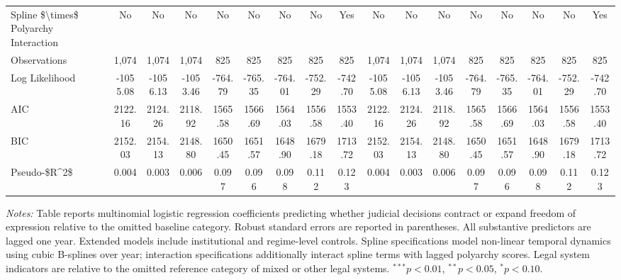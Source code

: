 \begin{table}[htbp]
\begin{tabular}{lcccccccccccccccc}
Spline \$\textbackslash{}times\$ Polyarchy Interaction & No & No & No & No & No & No & No & Yes & No & No & No & No & No & No & No & Yes \\
\addlinespace
\midrule
Observations & 1,074 & 1,074 & 1,074 & 825 & 825 & 825 & 825 & 825 & 1,074 & 1,074 & 1,074 & 825 & 825 & 825 & 825 & 825 \\
Log Likelihood & -1055.08 & -1056.13 & -1053.46 & -764.79 & -765.35 & -764.01 & -752.29 & -742.70 & -1055.08 & -1056.13 & -1053.46 & -764.79 & -765.35 & -764.01 & -752.29 & -742.70 \\
AIC & 2122.16 & 2124.26 & 2118.92 & 1565.58 & 1566.69 & 1564.03 & 1556.58 & 1553.40 & 2122.16 & 2124.26 & 2118.92 & 1565.58 & 1566.69 & 1564.03 & 1556.58 & 1553.40 \\
BIC & 2152.03 & 2154.13 & 2148.80 & 1650.45 & 1651.57 & 1648.90 & 1679.18 & 1713.72 & 2152.03 & 2154.13 & 2148.80 & 1650.45 & 1651.57 & 1648.90 & 1679.18 & 1713.72 \\
Pseudo-\$R\textasciicircum{}2\$ & 0.004 & 0.003 & 0.006 & 0.097 & 0.096 & 0.098 & 0.112 & 0.123 & 0.004 & 0.003 & 0.006 & 0.097 & 0.096 & 0.098 & 0.112 & 0.123 \\

\bottomrule

\end{tabular}

\vspace{0.4em}

\begin{minipage}{0.97\linewidth}
\footnotesize
\textit{Notes:} Table reports multinomial logistic regression coefficients predicting whether judicial decisions contract or expand freedom of expression relative to the omitted baseline category. Robust standard errors are reported in parentheses. All substantive predictors are lagged one year. Extended models include institutional and regime-level controls. Spline specifications model non-linear temporal dynamics using cubic B-splines over year; interaction specifications additionally interact spline terms with lagged polyarchy scores. Legal system indicators are relative to the omitted reference category of mixed or other legal systems. $^{***}p<0.01$, $^{**}p<0.05$, $^{*}p<0.10$.
\end{minipage}

\end{table}